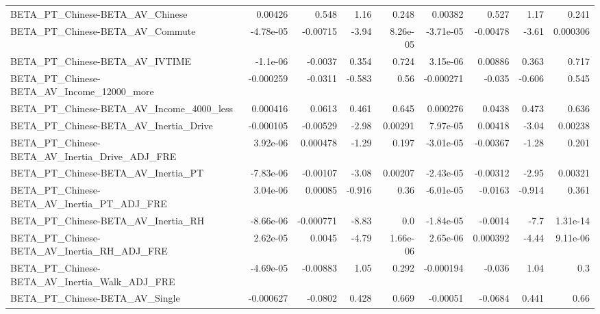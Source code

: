 \begin{tabular}{lrrrrrrrr}
BETA\_PT\_Chinese-BETA\_AV\_Chinese                    &     0.00426 &        0.548 &     1.16 &    0.248 &    0.00382 &       0.527 &         1.17 &         0.241 \\
BETA\_PT\_Chinese-BETA\_AV\_Commute                    &   -4.78e-05 &     -0.00715 &    -3.94 & 8.26e-05 &  -3.71e-05 &    -0.00478 &        -3.61 &      0.000306 \\
BETA\_PT\_Chinese-BETA\_AV\_IVTIME                     &    -1.1e-06 &      -0.0037 &    0.354 &    0.724 &   3.15e-06 &     0.00886 &        0.363 &         0.717 \\
BETA\_PT\_Chinese-BETA\_AV\_Income\_12000\_more          &   -0.000259 &      -0.0311 &   -0.583 &     0.56 &  -0.000271 &      -0.035 &       -0.606 &         0.545 \\
BETA\_PT\_Chinese-BETA\_AV\_Income\_4000\_less           &    0.000416 &       0.0613 &    0.461 &    0.645 &   0.000276 &      0.0438 &        0.473 &         0.636 \\
BETA\_PT\_Chinese-BETA\_AV\_Inertia\_Drive              &   -0.000105 &     -0.00529 &    -2.98 &  0.00291 &   7.97e-05 &     0.00418 &        -3.04 &       0.00238 \\
BETA\_PT\_Chinese-BETA\_AV\_Inertia\_Drive\_ADJ\_FRE      &    3.92e-06 &     0.000478 &    -1.29 &    0.197 &  -3.01e-05 &    -0.00367 &        -1.28 &         0.201 \\
BETA\_PT\_Chinese-BETA\_AV\_Inertia\_PT                 &   -7.83e-06 &     -0.00107 &    -3.08 &  0.00207 &  -2.43e-05 &    -0.00312 &        -2.95 &       0.00321 \\
BETA\_PT\_Chinese-BETA\_AV\_Inertia\_PT\_ADJ\_FRE         &    3.04e-06 &      0.00085 &   -0.916 &     0.36 &  -6.01e-05 &     -0.0163 &       -0.914 &         0.361 \\
BETA\_PT\_Chinese-BETA\_AV\_Inertia\_RH                 &   -8.66e-06 &    -0.000771 &    -8.83 &      0.0 &  -1.84e-05 &     -0.0014 &         -7.7 &      1.31e-14 \\
BETA\_PT\_Chinese-BETA\_AV\_Inertia\_RH\_ADJ\_FRE         &    2.62e-05 &       0.0045 &    -4.79 & 1.66e-06 &   2.65e-06 &    0.000392 &        -4.44 &      9.11e-06 \\
BETA\_PT\_Chinese-BETA\_AV\_Inertia\_Walk\_ADJ\_FRE       &   -4.69e-05 &     -0.00883 &     1.05 &    0.292 &  -0.000194 &      -0.036 &         1.04 &           0.3 \\
BETA\_PT\_Chinese-BETA\_AV\_Single                     &   -0.000627 &      -0.0802 &    0.428 &    0.669 &   -0.00051 &     -0.0684 &        0.441 &          0.66 \\

\end{tabular}
